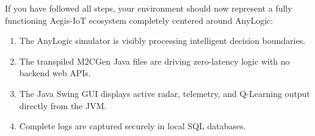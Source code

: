 \documentclass[12pt,a4paper]{article}
\begin{document}
If you have followed all steps, your environment should now represent a fully functioning Aegis-IoT ecosystem completely centered around AnyLogic:
\begin{enumerate}
    \item The AnyLogic simulator is visibly processing intelligent decision boundaries.
    \item The transpiled M2CGen Java files are driving zero-latency logic with no backend web APIs.
    \item The Java Swing GUI displays active radar, telemetry, and Q-Learning output directly from the JVM.
    \item Complete logs are captured securely in local SQL databases.
\end{enumerate}
\end{document}
